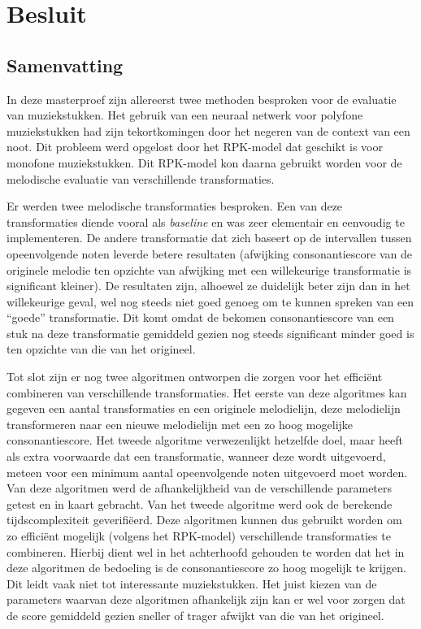 \chapter{Besluit}
\label{hoofdstuk:B}

\section{Samenvatting}
In deze masterproef zijn allereerst twee methoden besproken voor de evaluatie van muziekstukken. Het gebruik van een neuraal netwerk voor polyfone muziekstukken had zijn tekortkomingen door het negeren van de context van een noot. Dit probleem werd opgelost door het RPK-model dat geschikt is voor monofone muziekstukken. Dit RPK-model kon daarna gebruikt worden voor de melodische evaluatie van verschillende transformaties.

Er werden twee melodische transformaties besproken. Een van deze transformaties diende vooral als \textit{baseline} en was zeer elementair en eenvoudig te implementeren. De andere transformatie dat zich baseert op de intervallen tussen opeenvolgende noten leverde betere resultaten (afwijking consonantiescore van de originele melodie ten opzichte van afwijking met een willekeurige transformatie is significant kleiner). De resultaten zijn, alhoewel ze duidelijk beter zijn dan in het willekeurige geval, wel nog steeds niet goed genoeg om te kunnen spreken van een ``goede'' transformatie. Dit komt omdat de bekomen consonantiescore van een stuk na deze transformatie gemiddeld gezien nog steeds significant minder goed is ten opzichte van die van het origineel.

Tot slot zijn er nog twee algoritmen ontworpen die zorgen voor het effici\"ent combineren van verschillende transformaties. Het eerste van deze algoritmes kan gegeven een aantal transformaties en een originele melodielijn, deze melodielijn transformeren naar een nieuwe melodielijn met een zo hoog mogelijke consonantiescore. Het tweede algoritme verwezenlijkt hetzelfde doel, maar heeft als extra voorwaarde dat een transformatie, wanneer deze wordt uitgevoerd, meteen voor een minimum aantal opeenvolgende noten uitgevoerd moet worden. Van deze algoritmen werd de afhankelijkheid van de verschillende parameters getest en in kaart gebracht. Van het tweede algoritme werd ook de berekende tijdscomplexiteit geverifi\"eerd. Deze algoritmen kunnen dus gebruikt worden om zo effici\"ent mogelijk (volgens het RPK-model) verschillende transformaties te combineren. Hierbij dient wel in het achterhoofd gehouden te worden dat het in deze algoritmen de bedoeling is de consonantiescore zo hoog mogelijk te krijgen. Dit leidt vaak niet tot interessante muziekstukken. Het juist kiezen van de parameters waarvan deze algoritmen afhankelijk zijn kan er wel voor zorgen dat de score gemiddeld gezien sneller of trager afwijkt van die van het origineel.

